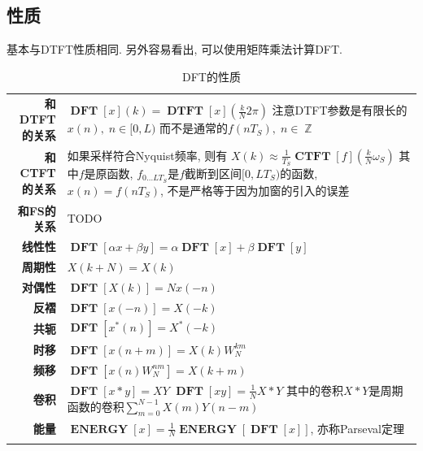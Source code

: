 \documentclass{ctexart}
\DeclareMathOperator{\CTFT}{\mathbf{CTFT}}
\DeclareMathOperator{\DTFT}{\mathbf{DTFT}}
\DeclareMathOperator{\DFT}{\mathbf{DFT}}
\DeclareMathOperator{\ENERGY}{\mathbf{ENERGY}}
\DeclareMathOperator{\Zset}{\mathbb{Z}}
\newlength{\Oldarrayrulewidth}
\newcommand{\Hline}[1]{
  \noalign{\global\setlength{\Oldarrayrulewidth}{\arrayrulewidth}}
  \noalign{\global\setlength{\arrayrulewidth}{#1}}\hline
  \noalign{\global\setlength{\arrayrulewidth}{\Oldarrayrulewidth}}}
\newcommand{\Topline}{\Hline{0.08em}}
\newcommand{\Bottomline}{\Hline{0.08em}}
\begin{document}
\subsection{性质}
    基本与DTFT性质相同. 另外容易看出, 可以使用矩阵乘法计算DFT.\par
    \begin{table}[ht!]
    \begin{tabularx}{\textwidth}{|>{\bfseries}r  L|}
        \Topline
        和DTFT的关系 &  $\DFT[x](k) = \DTFT[x](\frac{k}{N} 2\pi)$\newline
                        注意DTFT参数是有限长的$x(n),\;n\in[0, L)$\newline
                        而不是通常的$f(nT_S),\;n\in\Zset$ \\
        和CTFT的关系 &  如果采样符合Nyquist频率, 则有\newline
                        $X(k) \approx \frac{1}{T_S} \CTFT[f] (\frac{k}{N} \omega_S)$ \newline
                        其中$f$是原函数, $f_{0\ldots LT_S}$是$f$截断到区间$[0, LT_S)$的函数, 
                        $x(n) = f(nT_S)$, 不是严格等于因为加窗的引入的误差  \\
        和FS的关系 & TODO\\
        线性性 &  $\displaystyle \DFT[\alpha x + \beta y] = \alpha \DFT[x] + \beta \DFT[y]$    \\
        周期性 &  $\displaystyle X(k + N) = X(k)$    \\
        对偶性 &  $\displaystyle \DFT[X(k)] = N x(-n)$    \\
        反褶 &  $\displaystyle \DFT[x(-n)] = X(-k)$    \\
        共轭 &  $\displaystyle \DFT[x^*(n)] = X^*(-k)$    \\
        时移 &  $\displaystyle \DFT[x(n + m)] = X(k) W_N^{km}$    \\
        频移 &  $\displaystyle \DFT[x(n) W_N^{nm}] = X(k + m)$    \\
        卷积 &  $\displaystyle \DFT[x * y] = X Y$\newline
                $\DFT[x y] = \frac{1}{N} X * Y$\newline
                其中的卷积$X * Y$是周期函数的卷积$\sum_{m = 0}^{N-1} X(m) Y(n-m)$   \\
        能量 &  $\displaystyle \ENERGY[x] = \frac{1}{N} \ENERGY[\DFT[x]]$, 亦称Parseval定理\\
        \Bottomline
    \end{tabularx}
    \caption{DFT的性质}
    \end{table}
\end{document}
